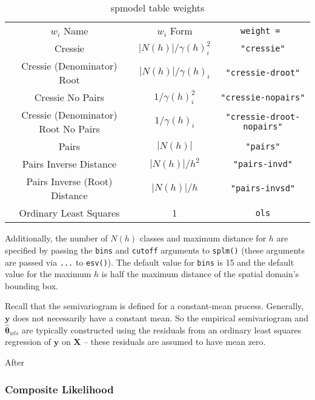 \documentclass{article}
\begin{document}
\begin{table}\label{tab:weights}
  \centering
  \begin{tabular}{c|c|c}
  \hline
  $w_i$ Name & $w_i$ Form & \texttt{weight = } \\
  Cressie & $|N(h)| / \gamma(h)_i^2$ & \texttt{"cressie"} \\
  Cressie (Denominator) Root & $|N(h)| / \gamma(h)_i$ & \texttt{"cressie-droot"} \\
  Cressie No Pairs & $1 / \gamma(h)_i^2$ & \texttt{"cressie-nopairs"} \\
  Cressie (Denominator) Root No Pairs & $1 / \gamma(h)_i$ & \texttt{"cressie-droot-nopairs"} \\
  Pairs & $|N(h)|$ & \texttt{"pairs"} \\
  Pairs Inverse Distance & $|N(h)| / h^2$ & \texttt{"pairs-invd"} \\
  Pairs Inverse (Root) Distance & $|N(h)| / h$ & \texttt{"pairs-invsd"} \\
  Ordinary Least Squares & 1 & \texttt{ols}
  \end{tabular}
  \caption{spmodel table weights}
\end{table}

Additionally, the number of \(N(h)\) classes and maximum distance for
\(h\) are specified by passing the \texttt{bins} and \texttt{cutoff}
arguments to \texttt{splm()} (these arguments are passed via
\texttt{...} to \texttt{esv()}). The default value for \texttt{bins} is
15 and the default value for the maximum \(h\) is half the maximum
distance of the spatial domain's bounding box.

Recall that the semivariogram is defined for a constant-mean process.
Generally, \(\mathbf{y}\) does not necessarily have a constant mean. So
the empirical semivariogram and \(\bm{\hat{\theta}}_{wls}\) are
typically constructed using the residuals from an ordinary least squares
regression of \(\mathbf{y}\) on \(\mathbf{X}\) -- these residuals are
assumed to have mean zero.

After

\hypertarget{composite-likelihood}{%
\subsubsection{Composite Likelihood}\label{composite-likelihood}}
\end{document}
